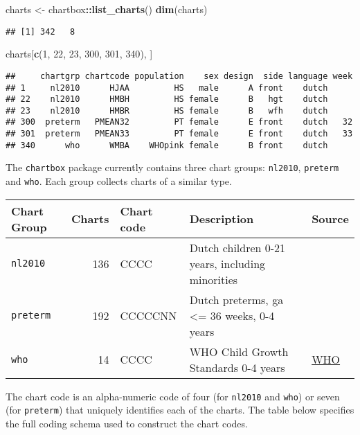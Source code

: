 \documentclass[]{book}
\newenvironment{Shaded}{\begin{snugshade}}{\end{snugshade}}
\newcommand{\DecValTok}[1]{\textcolor[rgb]{0.00,0.00,0.81}{#1}}
\newcommand{\KeywordTok}[1]{\textcolor[rgb]{0.13,0.29,0.53}{\textbf{#1}}}
\newcommand{\NormalTok}[1]{#1}
\newcommand{\OperatorTok}[1]{\textcolor[rgb]{0.81,0.36,0.00}{\textbf{#1}}}
\newcommand{\StringTok}[1]{\textcolor[rgb]{0.31,0.60,0.02}{#1}}
\begin{document}
\begin{Shaded}
\begin{Highlighting}[]
\NormalTok{charts <-}\StringTok{ }\NormalTok{chartbox}\OperatorTok{::}\KeywordTok{list_charts}\NormalTok{()}
\KeywordTok{dim}\NormalTok{(charts)}
\end{Highlighting}
\end{Shaded}

\begin{verbatim}
## [1] 342   8
\end{verbatim}

\begin{Shaded}
\begin{Highlighting}[]
\NormalTok{charts[}\KeywordTok{c}\NormalTok{(}\DecValTok{1}\NormalTok{, }\DecValTok{22}\NormalTok{, }\DecValTok{23}\NormalTok{, }\DecValTok{300}\NormalTok{, }\DecValTok{301}\NormalTok{, }\DecValTok{340}\NormalTok{), ]}
\end{Highlighting}
\end{Shaded}

\begin{verbatim}
##     chartgrp chartcode population    sex design  side language week
## 1     nl2010      HJAA         HS   male      A front    dutch     
## 22    nl2010      HMBH         HS female      B   hgt    dutch     
## 23    nl2010      HMBR         HS female      B   wfh    dutch     
## 300  preterm   PMEAN32         PT female      E front    dutch   32
## 301  preterm   PMEAN33         PT female      E front    dutch   33
## 340      who      WMBA    WHOpink female      B front    dutch
\end{verbatim}

The \texttt{chartbox} package currently contains three chart groups: \texttt{nl2010}, \texttt{preterm} and \texttt{who}. Each group collects charts of a similar type.

\begin{longtable}[]{@{}lrlll@{}}
\toprule
Chart Group & Charts & Chart code & Description & Source\tabularnewline
\midrule
\endhead
\texttt{nl2010} & 136 & CCCC & Dutch children 0-21 years, including minorities & \citet{talma2010}\tabularnewline
\texttt{preterm} & 192 & CCCCCNN & Dutch preterms, ga \textless{}= 36 weeks, 0-4 years & \citet{bocca2012}\tabularnewline
\texttt{who} & 14 & CCCC & WHO Child Growth Standards 0-4 years & \href{https://www.who.int/childgrowth/en/}{WHO}\tabularnewline
\bottomrule
\end{longtable}

The chart code is an alpha-numeric code of four (for \texttt{nl2010} and \texttt{who}) or seven (for \texttt{preterm}) that uniquely identifies each of the charts. The table below specifies the full coding schema used to construct the chart codes.
\end{document}
